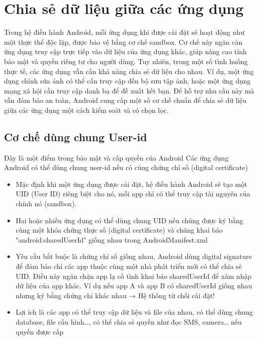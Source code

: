 \section{Chia sẻ dữ liệu giữa các ứng dụng}

\begin{flushleft}
  \hspace*{0.8cm}Trong hệ điều hành Android, mỗi ứng dụng khi được cài đặt sẽ hoạt động như một thực thể độc lập, được bảo vệ bằng cơ chế sandbox. Cơ chế này ngăn cản ứng dụng truy cập trực tiếp vào dữ liệu của ứng dụng khác, giúp nâng cao tính bảo mật và quyền riêng tư cho người dùng. Tuy nhiên, trong một số tình huống thực tế, các ứng dụng vẫn cần khả năng chia sẻ dữ liệu cho nhau. Ví dụ, một ứng dụng chỉnh sửa ảnh có thể cần truy cập đến bộ sưu tập ảnh, hoặc một ứng dụng mạng xã hội cần truy cập danh bạ để đề xuất kết bạn. Để hỗ trợ nhu cầu này mà vẫn đảm bảo an toàn, Android cung cấp một số cơ chế chuẩn để chia sẻ dữ liệu giữa các ứng dụng một cách kiểm soát và có chọn lọc.
\end{flushleft}

\subsection{Cơ chế dùng chung User-id}
\renewcommand{\labelitemi}{--}    
    \begin{flushleft}
        \hspace*{0.8cm}Đây là một điểm trong bảo mật và cấp quyền của Android Các ứng dụng Android có thể dùng chung user-id nếu có cùng chứng chỉ số (digital certificate)
        \setlength{\leftmargini}{1.5cm}
        \begin{itemize}
            \item Mặc định khi một ứng dụng được cài đặt, hệ điều hành Android sẽ tạo một UID (User ID) riêng biệt cho nó, mỗi app chỉ có thể truy cập tài nguyên của chính nó (sandbox).
            \item Hai hoặc nhiều ứng dụng có thể dùng chung UID nếu chúng được ký bằng cùng một khóa chứng thực số (digital certificate) và chúng khai báo "android:sharedUserId" giống nhau trong AndroidManifest.xml
            \item Yêu cầu bắt buộc là chứng chỉ số giống nhau, Android dùng digital signature để đảm bảo chỉ các app thuộc cùng một nhà phát triển mới có thể chia sẻ UID. Điều này ngăn chặn app lạ cố tình khai báo sharedUserId để xâm nhập dữ liệu của app khác.
            Ví dụ nếu app A và app B có sharedUserId giống nhau nhưng ký bằng chứng chỉ khác nhau → Hệ thống từ chối cài đặt!
            \item Lợi ích là các app có thể truy cập dữ liệu và file của nhau, có thể dùng chung database, file cấu hình…, có thể chia sẻ quyền như đọc SMS, camera… nếu quyền được cấp
        \end{itemize}
    \end{flushleft}

